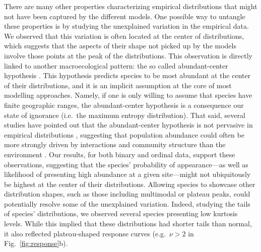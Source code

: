 \documentclass[11pt, a4paper]{article}
\begin{document}
There are many other properties characterizing empirical distributions that might not have been captured by the different models. One possible way to untangle these properties is by studying the unexplained variation in the empirical data. We observed that this variation is often located at the center of distributions, which suggests that the aspects of their shape not picked up by the models involve those points at the peak of the distributions. This observation is directly linked to another macroecological pattern: the so called abundant-center hypothesis \citep{sagarinAbundantCentreDistribution2002}. This hypothesis predicts species to be most abundant at the center of their distributions, and it is an implicit assumption at the core of most modelling approaches. Namely, if one is only willing to assume that species have finite geographic ranges, the abundant-center hypothesis is a consequence our state of ignorance (i.e.~the maximum entropy distribution). That said, several studies have pointed out that the abundant-center hypothesis is not pervasive in empirical distributions \citep{wagnerSimilarPerformanceCentral2011, pirononGeographicVariationGenetic2017, dallasSpeciesAreNot2017}, suggesting that population abundance could often be more strongly driven by interactions and community structure than the environment \citep{dallasSpeciesAreNot2017}. Our results, for both binary and ordinal data, support these observations, suggesting that the species' probability of appearance---as well as likelihood of presenting high abundance at a given site---might not ubiquitously be highest at the center of their distributions. Allowing species to showcase other distribution shapes, such as those including multimodal or plateau peaks, could potentially resolve some of the unexplained variation. Indeed, studying the tails of species' distributions, we observed several species presenting low kurtosis levels. While this implied that these distributions had shorter tails than normal, it also reflected plateau-shaped response curves (e.g.~$\nu>2$ in Fig.~\ref{fig:response}b).
\end{document}
